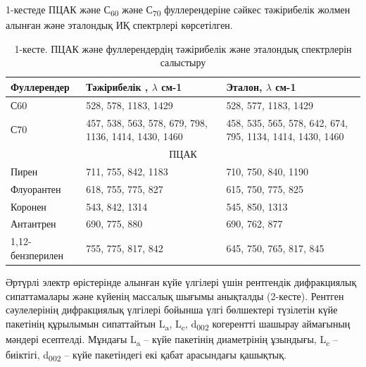 \begin{multicols}{2}
1-кестеде ПЦАК және С\textsubscript{60} және С\textsubscript{70}
фуллерендеріне сәйкес тәжірибелік жолмен алынған және эталондық ИҚ
спектрлері көрсетілген.
\end{multicols}

\begin{table}[H]
\caption*{1-кесте. ПЦАК және фуллерендердің тәжірибелік және эталондық спектрлерін салыстыру}
\centering
\begin{tabular}{|lll|}
\hline
\multicolumn{1}{|l|}{Фуллерендер} & \multicolumn{1}{l|}{Тәжірибелік , $\lambda$ см-1} & Эталон, $\lambda$ см-1 \\ \hline
\multicolumn{1}{|l|}{С60} & \multicolumn{1}{l|}{528, 578, 1183, 1429} & 528, 577,  1183, 1429 \\ \hline
\multicolumn{1}{|l|}{С70} & \multicolumn{1}{p{0.3\textwidth}|}{457, 538, 563, 578, 679, 798, 1136, 1414, 1430, 1460} & \multicolumn{1}{p{0.3\textwidth}|}{458, 535, 565, 578, 642, 674, 795, 1134, 1414, 1430, 1460} \\ \hline
\multicolumn{3}{|c|}{ПЦАК} \\ \hline
\multicolumn{1}{|l|}{Пирен} & \multicolumn{1}{l|}{711, 755, 842, 1183} & 710, 750, 840, 1190 \\ \hline
\multicolumn{1}{|l|}{Флуорантен} & \multicolumn{1}{l|}{618, 755, 775, 827} & 615, 750, 775, 825 \\ \hline
\multicolumn{1}{|l|}{Коронен} & \multicolumn{1}{l|}{543, 842, 1314} & 545, 850, 1313 \\ \hline
\multicolumn{1}{|l|}{Антантрен} & \multicolumn{1}{l|}{690, 775, 880} & 690, 762, 877 \\ \hline
\multicolumn{1}{|l|}{1,12-бензперилен} & \multicolumn{1}{l|}{755, 775, 817, 842} & 645, 750, 765, 817, 845 \\ \hline
\end{tabular}
\end{table}

\begin{multicols}{2}
Әртүрлі электр өрістерінде алынған күйе үлгілері үшін рентгендік
дифракциялық сипаттамалары және күйенің массалық шығымы анықталды
(2-кесте). Рентген сәулелерінің дифракциялық үлгілері бойынша үлгі
бөлшектері түзілетін күйе пакетінің құрылымын сипаттайтын
L\textsubscript{a}, L\textsubscript{c}, d\textsubscript{002} когерентті
шашырау аймағының мәндері есептелді. Мұндағы L\textsubscript{a} -- күйе
пакетінің диаметрінің ұзындығы, L\textsubscript{c} -- биіктігі,
d\textsubscript{002} -- күйе пакетіндегі екі қабат арасындағы қашықтық.
\end{multicols}

